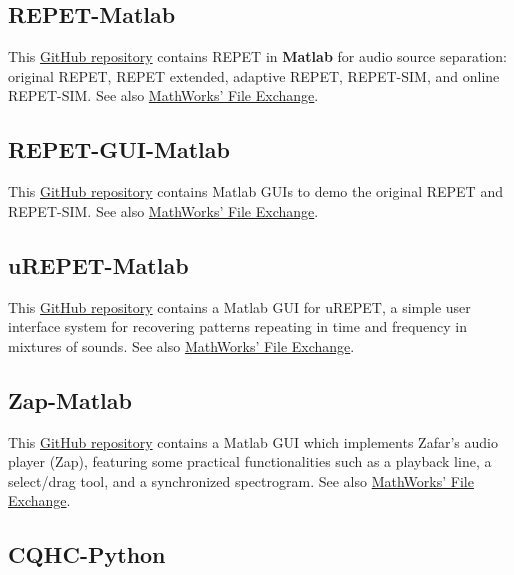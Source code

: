 \documentclass{article}
\begin{document}
\subsection{REPET-Matlab}
\label{ssec:repet-matlab}

This \href{https://github.com/zafarrafii/REPET-Matlab}{GitHub repository} contains REPET in \textbf{Matlab} for audio source separation: original REPET, REPET extended, adaptive REPET, REPET-SIM, and online REPET-SIM. See also \href{https://www.mathworks.com/matlabcentral/fileexchange/88803-repet-matlab}{MathWorks' File Exchange}.


\subsection{REPET-GUI-Matlab}
\label{ssec:repet-gui-matlab}

This \href{https://github.com/zafarrafii/REPET-GUI-Matlab}{GitHub repository} contains Matlab GUIs to demo the original REPET and REPET-SIM. See also \href{https://www.mathworks.com/matlabcentral/fileexchange/90736-repet-gui-matlab}{MathWorks' File Exchange}.


\subsection{uREPET-Matlab}
\label{ssec:urepet-matlab}

This \href{https://github.com/zafarrafii/uREPET-Matlab}{GitHub repository} contains a Matlab GUI for uREPET, a simple user interface system for recovering patterns repeating in time and frequency in mixtures of sounds. See also \href{https://www.mathworks.com/matlabcentral/fileexchange/90606-urepet-matlab}{MathWorks' File Exchange}.


\subsection{Zap-Matlab}
\label{ssec:zap-matlab}

This \href{https://github.com/zafarrafii/Zap-Matlab}{GitHub repository} contains a Matlab GUI which implements Zafar's audio player (Zap), featuring some practical functionalities such as a playback line, a select/drag tool, and a synchronized spectrogram. See also \href{https://www.mathworks.com/matlabcentral/fileexchange/90741-zap-matlab}{MathWorks' File Exchange}.


\subsection{CQHC-Python}
\label{ssec:cqhc-python}
\end{document}
